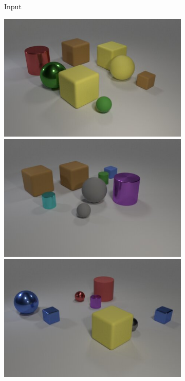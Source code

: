 \begin{figure}
\begin{subfigure}{.3225\linewidth}
\caption{Input}
\end{subfigure}
\hfill
\begin{subfigure}{.3225\linewidth}
\centering
\includegraphics[width=\linewidth]{figures/clevr/ns-vqa/2.jpg}\\
\includegraphics[width=\linewidth]{figures/clevr/ns-vqa/3.jpg}\\
\includegraphics[width=\linewidth]{figures/clevr/ns-vqa/4.jpg}\\

\end{subfigure}
\end{figure}
